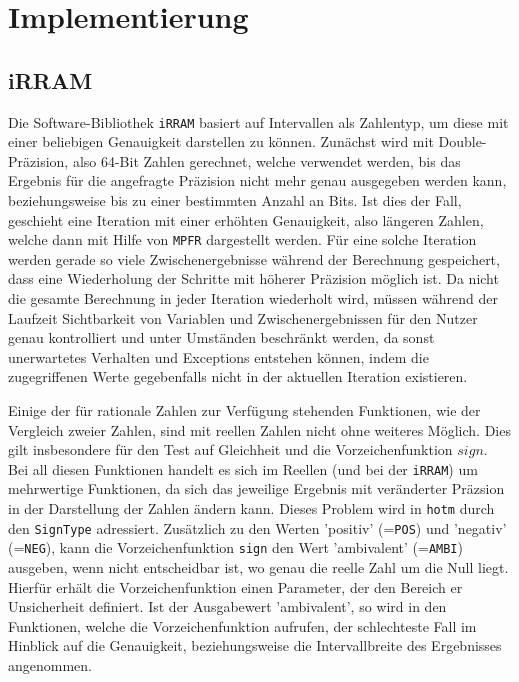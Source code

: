 
\chapter{Implementierung}
\label{ch:Implementierung}



\section{iRRAM}
\label{sec:irram}
Die Software-Bibliothek \verb+iRRAM+ \cite{Mller2009EnhancingIE} basiert auf Intervallen als Zahlentyp, um diese mit einer beliebigen Genauigkeit darstellen zu können. Zunächst wird mit Double-Präzision, also 64-Bit Zahlen gerechnet, welche verwendet werden, bis das Ergebnis für die angefragte Präzision nicht mehr genau ausgegeben werden kann, beziehungsweise bis zu einer bestimmten Anzahl an Bits. Ist dies der Fall, geschieht eine Iteration mit einer erhöhten Genauigkeit, also längeren Zahlen, welche dann mit Hilfe von \verb+MPFR+ dargestellt werden.
Für eine solche Iteration werden gerade so viele Zwischenergebnisse während der Berechnung gespeichert, dass eine Wiederholung der Schritte mit höherer Präzision möglich ist. Da nicht die gesamte Berechnung in jeder Iteration wiederholt wird, müssen während der Laufzeit Sichtbarkeit von Variablen und Zwischenergebnissen für den Nutzer genau kontrolliert und unter Umständen beschränkt werden, da sonst unerwartetes Verhalten und Exceptions entstehen können, indem die zugegriffenen Werte gegebenfalls nicht in der aktuellen Iteration existieren.


Einige der für rationale Zahlen zur Verfügung stehenden Funktionen, wie der Vergleich zweier Zahlen, sind mit reellen Zahlen nicht ohne weiteres Möglich. Dies gilt insbesondere für den Test auf Gleichheit und die Vorzeichenfunktion $sign$. Bei all diesen Funktionen handelt es sich im Reellen (und bei der \verb+iRRAM+) um mehrwertige Funktionen, da sich das jeweilige Ergebnis mit veränderter Präzsion in der Darstellung der Zahlen ändern kann. Dieses Problem wird in \verb+hotm+ durch den \verb+SignType+ adressiert. Zusätzlich zu den Werten 'positiv' (=\verb+POS+) und 'negativ' (=\verb+NEG+),  kann die Vorzeichenfunktion \verb+sign+ den Wert 'ambivalent' (=\verb+AMBI+) ausgeben, wenn nicht entscheidbar ist, wo genau die reelle Zahl um die Null liegt. Hierfür erhält die Vorzeichenfunktion einen Parameter, der den Bereich er Unsicherheit definiert. Ist der Ausgabewert 'ambivalent', so wird in den Funktionen, welche die Vorzeichenfunktion aufrufen, der schlechteste Fall im Hinblick auf die Genauigkeit, beziehungsweise die Intervallbreite des Ergebnisses angenommen. 


